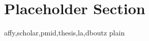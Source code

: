 







% 
% 
% 










\section{Placeholder Section}
\label{XXX}

 {affy,scholar,pmid,thesis,la,dboutz}    %
 {plain}

